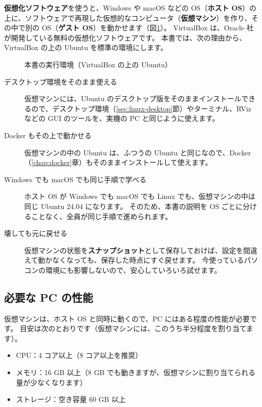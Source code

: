 \textbf{仮想化ソフトウェア}を使うと、Windows や macOS などの OS（\textbf{ホスト OS}）の上に、ソフトウェアで再現した仮想的なコンピュータ（\textbf{仮想マシン}）を作り、その中で別の OS（\textbf{ゲスト OS}）を動かせます（図\ref{fig:linux-virtualbox}）。
VirtualBox は、Oracle 社が開発している無料の仮想化ソフトウェアです。
本書では、次の理由から、VirtualBox の上の Ubuntu を標準の環境にします。

\begin{figure}[tb]
  \centering
  
  \caption{本書の実行環境（VirtualBox の上の Ubuntu）}
  \label{fig:linux-virtualbox}
\end{figure}

\begin{description}
  \item[デスクトップ環境をそのまま使える]
    仮想マシンには、Ubuntu のデスクトップ版をそのままインストールできるので、デスクトップ環境（\ref{sec:linux-desktop}節）やターミナル、RViz などの GUI のツールを、実機の PC と同じように使えます。
  \item[Docker もその上で動かせる]
    仮想マシンの中の Ubuntu は、ふつうの Ubuntu と同じなので、Docker（\ref{chap:docker}章）もそのままインストールして使えます。
  \item[Windows でも macOS でも同じ手順で学べる]
    ホスト OS が Windows でも macOS でも Linux でも、仮想マシンの中は同じ Ubuntu 24.04 になります。
    そのため、本書の説明を OS ごとに分けることなく、全員が同じ手順で進められます。
  \item[壊しても元に戻せる]
    仮想マシンの状態を\textbf{スナップショット}として保存しておけば、設定を間違えて動かなくなっても、保存した時点にすぐ戻せます。
    今使っているパソコンの環境にも影響しないので、安心していろいろ試せます。
\end{description}

\subsection{必要な PC の性能}

仮想マシンは、ホスト OS と同時に動くので、PC にはある程度の性能が必要です。
目安は次のとおりです（仮想マシンには、このうち半分程度を割り当てます）。

\begin{itemize}
  \item CPU：4 コア以上（8 コア以上を推奨）
  \item メモリ：16 GB 以上（8 GB でも動きますが、仮想マシンに割り当てられる量が少なくなります）
  \item ストレージ：空き容量 60 GB 以上
\end{itemize}

